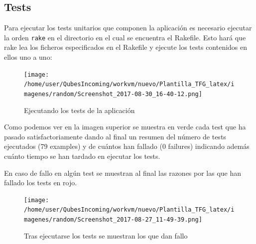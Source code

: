 \subsection{Tests}

Para ejecutar los tests unitarios que componen la aplicación es necesario ejecutar la orden \texttt{rake} en el directorio en el cual se encuentra el Rakefile. Esto hará que rake lea los ficheros especificados en el Rakefile y ejecute los tests contenidos en ellos uno a uno:

\begin{figure}[H] %
\centering
\texttt{[image: /home/user/QubesIncoming/workvm/nuevo/Plantilla\_TFG\_latex/imagenes/random/Screenshot\_2017-08-30\_16-40-12.png]}  %

\caption{Ejecutando los tests de la aplicación}\label{figura92}

\end{figure}

Como podemos ver en la imagen superior se muestra en verde cada test que ha pasado satisfactoriamente dando al final un resumen del número de tests ejecutados (79 examples) y de cuántos han fallado (0 failures) indicando además cuánto tiempo se han tardado en ejecutar los tests.
\par
En caso de fallo en algún test se muestran al final las razones por las que han fallado los tests en rojo.

\begin{figure}[H] %
\centering
\texttt{[image: /home/user/QubesIncoming/workvm/nuevo/Plantilla\_TFG\_latex/imagenes/random/Screenshot\_2017-08-27\_11-49-39.png]}  %

\caption{Tras ejecutarse los tests se muestran los que dan fallo}\label{figura94}

\end{figure}

